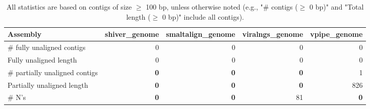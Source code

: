\documentclass[12pt,a4paper]{article}
\begin{document}
\begin{table}[ht]
\begin{center}
\caption{All statistics are based on contigs of size $\geq$ 100 bp, unless otherwise noted (e.g., "\# contigs ($\geq$ 0 bp)" and "Total length ($\geq$ 0 bp)" include all contigs).}
\begin{tabular}{|l*{4}{|r}|}
\hline
Assembly & shiver\_genome & smaltalign\_genome & viralngs\_genome & vpipe\_genome \\ \hline
\# fully unaligned contigs & 0 & 0 & 0 & 0 \\ \hline
Fully unaligned length & 0 & 0 & 0 & 0 \\ \hline
\# partially unaligned contigs & {\bf 0} & {\bf 0} & {\bf 0} & 1 \\ \hline
Partially unaligned length & {\bf 0} & {\bf 0} & {\bf 0} & 826 \\ \hline
\# N's & {\bf 0} & {\bf 0} & 81 & {\bf 0} \\ \hline
\end{tabular}
\end{center}
\end{table}
\end{document}
